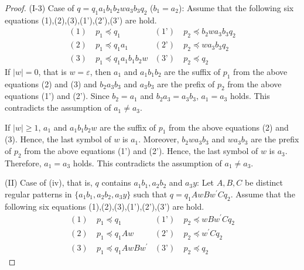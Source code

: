 \begin{proof}
\noindent
(I-3) Case of $q=q_{1}a_{1}b_{1}b_{2}wa_{3}b_{3}q_{2}$ ($b_{1}=a_{2}$):
Assume that the following six equations (1),(2),(3),(1'),(2'),(3') are hold.
\begin{align*}
(1)~& p_{1} \preceq q_{1} & (\text{1'})~& p_{2} \preceq b_{2}wa_{3}b_{3}q_{2} \\
(2)~& p_{1} \preceq q_{1}a_{1} & (\text{2'})~& p_{2} \preceq wa_{3}b_{3}q_{2} \\
(3)~& p_{1} \preceq q_{1}a_{1}b_{1}b_{2}w & (\text{3'})~& p_{2} \preceq q_{2}
\end{align*}
\noindent
If $|w|=0$, that is $w=\varepsilon$, then $a_{1}$ and $a_{1}b_{1}b_{2}$ are the suffix of $p_{1}$ from the above equations (2) and (3)
and $b_{2}a_{3}b_{3}$ and $a_{3}b_{3}$ are the prefix of $p_{2}$ from the above equations (1') and (2').
Since $b_{2}=a_{1}$ and $b_{2}a_{3}=a_{3}b_{3}$, $a_{1}=a_{3}$ holds.
This contradicts the assumption of $a_{1}\not= a_{3}$.

\noindent
If $|w| \ge 1$, $a_{1}$ and $a_{1}b_{1}b_{2}w$ are the suffix of $p_{1}$ from the above equations (2) and (3).
Hence, the last symbol of $w$ is $a_{1}$.
Moreover, $b_{2}wa_{3}b_{3}$ and $wa_{3}b_{3}$ are the prefix of $p_{2}$ from the above equations (1') and (2').
Hence, the last symbol of $w$ is $a_{3}$.
Therefore, $a_{1}=a_{3}$ holds.
This contradicts the assumption of $a_{1} \ne a_{3}$.
\smallskip

\noindent
(II) Case of (iv), that is, $q$ contains $a_{1}b_{1}, a_{2}b_{2}$ and $a_{3}y$:
Let $A,B,C$ be distinct regular patterns in $\{a_{1}b_{1}, a_{2}b_{2}, a_{3}y\}$ such that $q=q_{1}AwBw^{\prime}Cq_{2}$.
Assume that the following six equations (1),(2),(3),(1'),(2'),(3') are hold.
\begin{align*}
(1)~& p_{1} \preceq q_{1} & (\text{1'})~& p_{2} \preceq wBw^{\prime}Cq_{2} \\
(2)~& p_{1} \preceq q_{1}Aw & (\text{2'})~& p_{2} \preceq w^{\prime}Cq_{2} \\
(3)~& p_{1} \preceq q_{1}AwBw^{\prime} & (\text{3'})~& p_{2} \preceq q_{2}
\end{align*}


\end{proof}
